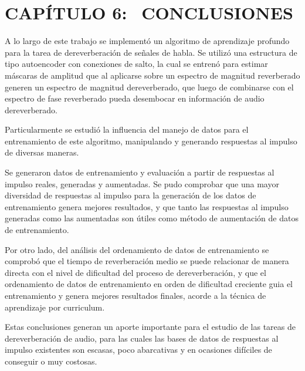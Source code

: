\section[Conclusiones]{CAPÍTULO 6:$\ \ \ \ $CONCLUSIONES} 

A lo largo de este trabajo se implementó un algoritmo de aprendizaje profundo para la tarea de dereverberación de señales de habla. Se utilizó una estructura de tipo autoencoder con conexiones de salto, la cual se entrenó para estimar máscaras de amplitud que al aplicarse sobre un espectro de magnitud reverberado generen un espectro de magnitud dereverberado, que luego de combinarse con el espectro de fase reverberado pueda desembocar en información de audio dereverberado.
 
Particularmente se estudió la influencia del manejo de datos para el entrenamiento de este algoritmo, manipulando y generando respuestas al impulso de diversas maneras. 

Se generaron datos de entrenamiento y evaluación a partir de respuestas al impulso reales, generadas y aumentadas. Se pudo comprobar que una mayor diversidad de respuestas al impulso para la generación de los datos de entrenamiento genera mejores resultados, y que tanto las respuestas al impulso generadas como las aumentadas son útiles como método de aumentación de datos de entrenamiento.

Por otro lado, del análisis del ordenamiento de datos de entrenamiento se comprobó que el tiempo de reverberación medio se puede relacionar de manera directa con el nivel de dificultad del proceso de dereverberación, y que el ordenamiento de datos de entrenamiento en orden de dificultad creciente guia el entrenamiento y genera mejores resultados finales, acorde a la técnica de aprendizaje por curriculum.
 
Estas conclusiones generan un aporte importante para el estudio de las tareas de dereverberación de audio, para las cuales las bases de datos de respuestas al impulso existentes son escasas, poco abarcativas y en ocasiones difíciles de conseguir o muy costosas.